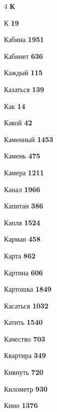 \begin{multicols}{4}
\vspace{0.6em}\noindent\textbf{\normalsize\sffamily\color{primary} К}\par\vspace{0.2em}
\noindent К \dotfill \textbf{\color{secondary} 19}\par
\noindent Кабина \dotfill \textbf{\color{secondary} 1951}\par
\noindent Кабинет \dotfill \textbf{\color{secondary} 636}\par
\noindent Каждый \dotfill \textbf{\color{secondary} 115}\par
\noindent Казаться \dotfill \textbf{\color{secondary} 139}\par
\noindent Как \dotfill \textbf{\color{secondary} 14}\par
\noindent Какой \dotfill \textbf{\color{secondary} 42}\par
\noindent Каменный \dotfill \textbf{\color{secondary} 1453}\par
\noindent Камень \dotfill \textbf{\color{secondary} 475}\par
\noindent Камера \dotfill \textbf{\color{secondary} 1211}\par
\noindent Канал \dotfill \textbf{\color{secondary} 1966}\par
\noindent Капитан \dotfill \textbf{\color{secondary} 386}\par
\noindent Капля \dotfill \textbf{\color{secondary} 1524}\par
\noindent Карман \dotfill \textbf{\color{secondary} 458}\par
\noindent Карта \dotfill \textbf{\color{secondary} 862}\par
\noindent Картина \dotfill \textbf{\color{secondary} 606}\par
\noindent Картошка \dotfill \textbf{\color{secondary} 1849}\par
\noindent Касаться \dotfill \textbf{\color{secondary} 1032}\par
\noindent Катить \dotfill \textbf{\color{secondary} 1540}\par
\noindent Качество \dotfill \textbf{\color{secondary} 703}\par
\noindent Квартира \dotfill \textbf{\color{secondary} 349}\par
\noindent Кивнуть \dotfill \textbf{\color{secondary} 720}\par
\noindent Километр \dotfill \textbf{\color{secondary} 930}\par
\noindent Кино \dotfill \textbf{\color{secondary} 1376}\par

\end{multicols}
